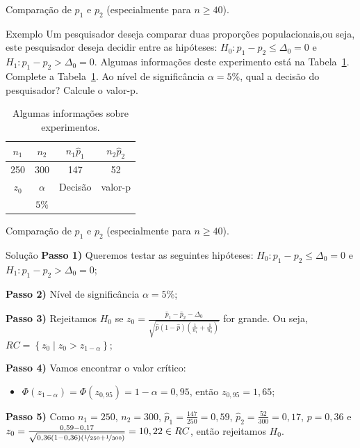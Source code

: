 \documentclass[9pt]{beamer}
\begin{document}
\begin{frame}{Comparação de $p_1$ e $p_2$ (especialmente para $n 
	\geq 40$).}

\begin{block}{Exemplo}
	Um pesquisador deseja comparar duas proporções populacionais,ou seja, este pesquisador deseja decidir entre as hipóteses: $H_0: p_1 - p_2 \leq \Delta_0 =0$ e $H_1: p_1 - p_2 > \Delta_0 =0$. Algumas informações deste experimento está na Tabela~\ref{tab:h1-less-2-proportion}. Complete a Tabela~\ref{tab:h1-less-2-proportion}. Ao nível de significância $\alpha=5\%$, qual a decisão do pesquisador? Calcule o valor-p.
	\begin{table}[htbp]
		\centering
		\begin{tabular}{c|c|c|c}
			\toprule[0.05cm]
			$n_1$ & $n_2$ & $n_1 \hat{p}_1$ & $n_2 \hat{p}_2$\\ \midrule
			250 & 300 & 147 & 52 \\ \midrule[0.05cm]
			$z_0$ & $\alpha$ & Decisão & valor-p \\ \midrule
			& $5\%$ & & \\
			\bottomrule[0.05cm]
		\end{tabular}
		\caption{Algumas informações sobre experimentos.}
		\label{tab:h1-less-2-proportion}
	\end{table}
\end{block}

\end{frame}

\begin{frame}{Comparação de $p_1$ e $p_2$ (especialmente para $n 
	\geq 40$).}

\Large
\begin{block}{Solução}
	\textbf{Passo 1)} Queremos testar as seguintes hipóteses: $H_0: p_1 - p_2 \leq \Delta_0=0$ e $H_1: p_1 - p_2 > \Delta_0=0$;
	
	\textbf{Passo 2)} Nível de significância $\alpha=5\%$;
	
	\textbf{Passo 3)} Rejeitamos $H_0$ se $z_0 = \frac{\hat{p}_1 - \hat{p}_2 -\Delta_0}{\sqrt{\hat{p}(1-\hat{p}) \left( \frac{1}{n_1} + \frac{1}{n_2} \right)}}$ for grande. Ou seja, $RC = \left\{ z_0 \mid z_0 > z_{1-\alpha} \right\}$;
	
	\textbf{Passo 4)} Vamos encontrar o valor crítico:
	\begin{itemize}
		\item $\Phi\left( z_{1-\alpha} \right) = \Phi\left( z_{0,95} \right) = 1-\alpha = 0,95$, então $z_{0,95} = 1,65$;
	\end{itemize}

	\textbf{Passo 5)} Como $n_1=250$, $n_2=300$, $\hat{p}_1 = \frac{147}{250} = 0,59$, $\hat{p}_2 = \frac{52}{300} = 0,17$, $p = 0,36$ e $z_0 = \frac{0,59 - 0,17}{\sqrt{0,36(1 - 0,36) \left( \nicefrac{1}{250} + \nicefrac{1}{300} \right)}} = 10,22 \in RC$, então rejeitamos  $H_0$.
\end{block}
\normalsize
\end{frame}
\end{document}
